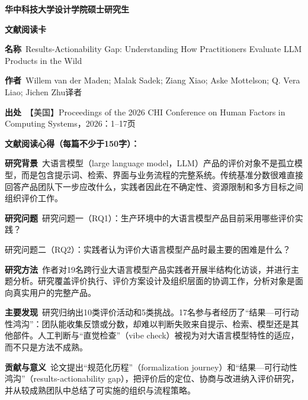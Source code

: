 {}
\label{chap:literature-cards}
\setlength{\parindent}{0pt}
\setlength{\parskip}{0pt}

\begin{center}
{\songti\bfseries\fontsize{18.5pt}{27.75pt}\selectfont 华中科技大学设计学院硕士研究生\par}
{\songti\bfseries\fontsize{18.5pt}{27.75pt}\selectfont 文献阅读卡\par}
\end{center}
\vspace{0.25em}
\noindent\underline{}\par
\vspace{0.35em}
\noindent\textbf{名称}\ Results-Actionability Gap: Understanding How Practitioners Evaluate LLM Products in the Wild\par
\noindent\textbf{作者}\ Willem van der Maden; Malak Sadek; Ziang Xiao; Aske Mottelson; Q. Vera Liao; Jichen Zhu\quad 译者\par
\noindent\textbf{出处}\ 【美国】Proceedings of the 2026 CHI Conference on Human Factors in Computing Systems，2026：1–17\quad 页\par
\vspace{0.35em}
\noindent\textbf{文献阅读心得（每篇不少于150字）：}\par
\noindent\textbf{研究背景}\ 大语言模型（large language model，LLM）产品的评价对象不是孤立模型，而是包含提示词、检索、界面与业务流程的完整系统。传统基准分数很难直接回答产品团队下一步应改什么，实践者因此在不确定性、资源限制和多方目标之间组织评价工作。\par
\noindent\textbf{研究问题}\ 研究问题一（RQ1）：生产环境中的大语言模型产品目前采用哪些评价实践？\par
研究问题二（RQ2）：实践者认为评价大语言模型产品时最主要的困难是什么？\par
\noindent\textbf{研究方法}\ 作者对19名跨行业大语言模型产品实践者开展半结构化访谈，并进行主题分析。研究覆盖评价执行、评价方案设计及组织层面的协调工作，分析对象是面向真实用户的完整产品。\par
\noindent\textbf{主要发现}\ 研究归纳出10类评价活动和5类挑战。17名参与者经历了“结果—可行动性鸿沟”：团队能收集反馈或分数，却难以判断失败来自提示、检索、模型还是其他部件。人工判断与“直觉检查”（vibe check）被视为对大语言模型特性的适应，而不只是方法不成熟。\par
\noindent\textbf{贡献与意义}\ 论文提出“规范化历程”（formalization journey）和“结果—可行动性鸿沟”（results-actionability gap），把评价后的定位、协商与改进纳入评价研究，并从较成熟团队中总结了可实施的组织与流程策略。\par
